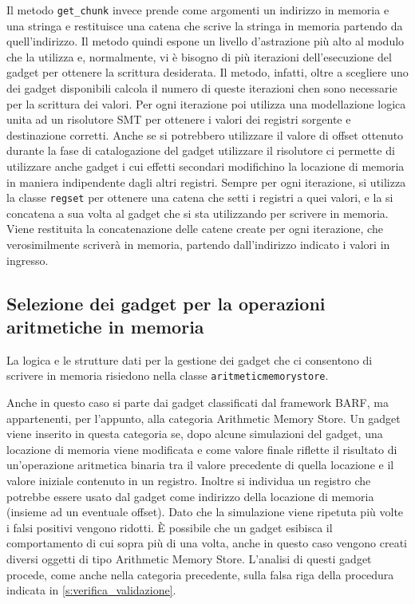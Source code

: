 Il metodo \lstinline{get_chunk} invece prende come argomenti un
indirizzo in memoria e una stringa e restituisce una catena che scrive
la stringa in memoria partendo da quell'indirizzo. Il metodo quindi
espone un livello d'astrazione più alto al modulo che la utilizza e,
normalmente, vi è bisogno di più iterazioni dell'esecuzione del gadget
per ottenere la scrittura desiderata. Il metodo, infatti, oltre a
scegliere uno dei gadget disponibili calcola il numero di queste
iterazioni chen sono necessarie per la scrittura dei valori. Per ogni
iterazione poi utilizza una modellazione logica unita ad un risolutore
SMT per ottenere i valori dei registri sorgente e destinazione
corretti. Anche se si potrebbero utilizzare il valore di offset
ottenuto durante la fase di catalogazione del gadget utilizzare il
risolutore ci permette di utilizzare anche gadget i cui effetti
secondari modifichino la locazione di memoria in maniera indipendente
dagli altri registri. Sempre per ogni iterazione, si utilizza la
classe \lstinline{regset} per ottenere una catena che setti i registri
a quei valori, e la si concatena a sua volta al gadget che si sta
utilizzando per scrivere in memoria. Viene restituita la
concatenazione delle catene create per ogni iterazione, che
verosimilmente scriverà in memoria, partendo dall'indirizzo indicato i
valori in ingresso.

\subsection{Selezione dei gadget per la operazioni aritmetiche in
  memoria}
\label{sec:arithmeticstore}

La logica e le strutture dati per la gestione dei gadget che ci
consentono di scrivere in memoria risiedono nella classe
\lstinline{aritmeticmemorystore}.

Anche in questo caso si parte dai gadget classificati dal framework
BARF, ma appartenenti, per l'appunto, alla categoria Arithmetic Memory
Store. Un gadget viene inserito in questa categoria se, dopo alcune
simulazioni del gadget, una locazione di memoria viene modificata e
come valore finale riflette il risultato di un'operazione aritmetica
binaria tra il valore precedente di quella locazione e il valore
iniziale contenuto in un registro. Inoltre si individua un registro
che potrebbe essere usato dal gadget come indirizzo della locazione di
memoria (insieme ad un eventuale offset). Dato che la simulazione
viene ripetuta più volte i falsi positivi vengono ridotti. È possibile
che un gadget esibisca il comportamento di cui sopra più di una volta,
anche in questo caso vengono creati diversi oggetti di tipo Arithmetic
Memory Store. L'analisi di questi gadget procede, come anche nella categoria
precedente, sulla falsa riga della procedura indicata in
\ref{s:verifica_validazione}.

